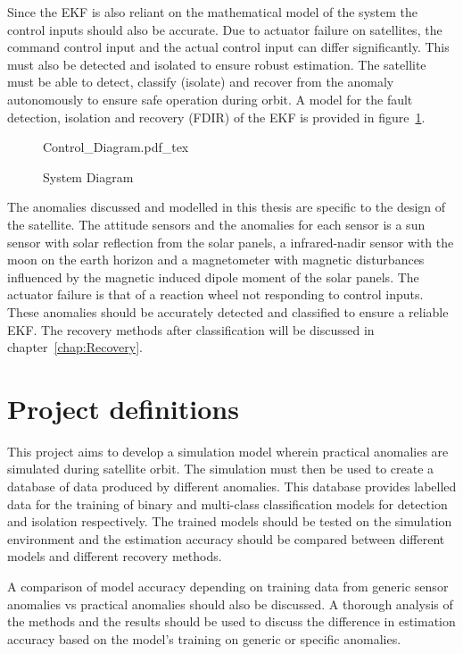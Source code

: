 Since the EKF is also reliant on the mathematical model of the system the control inputs should also be accurate. Due to actuator failure on satellites, the command control input and the actual control input can differ significantly. This must also be detected and isolated to ensure robust estimation. The satellite must be able to detect, classify (isolate) and recover from the anomaly autonomously to ensure safe operation during orbit. A model for the fault detection, isolation and recovery (FDIR) of the EKF is provided in figure~\ref{fig:System_Diagram}.

\begin{figure}[h!b!t]
	\centering
	\def\svgwidth{14cm}
	{Control_Diagram.pdf_tex}
	\caption{System Diagram}
	\label{fig:System_Diagram}
\end{figure}

The anomalies discussed and modelled in this thesis are specific to the design of the satellite. The attitude sensors and the anomalies for each sensor is a sun sensor with solar reflection from the solar panels, a infrared-nadir sensor with the moon on the earth horizon and a magnetometer with magnetic disturbances influenced by the magnetic induced dipole moment of the solar panels. The actuator failure is that of a reaction wheel not responding to control inputs. These anomalies should be accurately detected and classified to ensure a reliable EKF. The recovery methods after classification will be discussed in chapter~\ref{chap:Recovery}.

\section{Project definitions}
This project aims to develop a simulation model wherein practical anomalies are simulated during satellite orbit. The simulation must then be used to create a database of data produced by different anomalies. This database provides labelled data for the training of binary and multi-class classification models for detection and isolation respectively. The trained models should be tested on the simulation environment and the estimation accuracy should be compared between different models and different recovery methods.

A comparison of model accuracy depending on training data from generic sensor anomalies vs practical anomalies should also be discussed. A thorough analysis of the methods and the results should be used to discuss the difference in estimation accuracy based on the model's training on generic or specific anomalies. 

